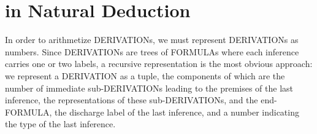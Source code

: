 \documentclass[10pt,a4paper]{article}
\newcommand*{\olup}[1]{\MakeUppercase{#1}}
\theoremstyle{plain}
\theoremstyle{definition}
\theoremstyle{remark}
\newenvironment{explain}{}{}
\newcommand*{\olfileid}[3]{}
\newcommand*{\olsection}[1]{\section*{#1}}
\begin{document}



\olfileid{inc}{art}{pnd}
\olsection{ in Natural Deduction}

\begin{explain}
In order to arithmetize \olup{derivation}s, we must represent
\olup{derivation}s as numbers. Since \olup{derivation}s are trees of
\olup{formula}s where each inference carries one or two labels, a
recursive representation is the most obvious approach: we represent a
\olup{derivation} as a tuple, the components of which are the number of
immediate sub-\olup{derivation}s leading to the premises of the last
inference, the representations of these sub-\olup{derivation}s, and the
end-\olup{formula}, the discharge label of the last inference, and a
number indicating the type of the last inference.
\end{explain}
\end{document}
